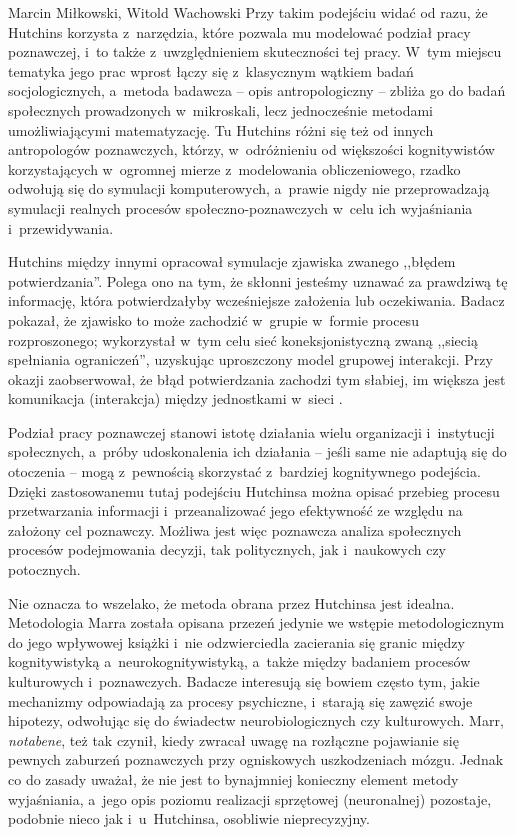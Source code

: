 \begin{artplenv2auth}{Marcin Miłkowski, Witold Wachowski}
Przy takim podejściu widać od razu, że Hutchins korzysta z~narzędzia, które pozwala mu modelować podział pracy poznawczej, i~to także z~uwzględnieniem skuteczności tej pracy. W~tym miejscu tematyka jego prac wprost łączy się z~klasycznym wątkiem badań socjologicznych, a~metoda badawcza -- opis antropologiczny -- zbliża go do badań społecznych prowadzonych w~mikroskali, lecz jednocześnie metodami umożliwiającymi matematyzację. Tu Hutchins różni się też od innych antropologów poznawczych, którzy, w~odróżnieniu od większości kognitywistów korzystających w~ogromnej mierze z~modelowania obliczeniowego, rzadko odwołują się do symulacji komputerowych, a~prawie nigdy nie przeprowadzają symulacji realnych procesów społeczno-poznawczych w~celu ich wyjaśniania i~przewidywania.

Hutchins między innymi opracował symulacje zjawiska zwanego ,,błędem potwierdzania''. Polega ono na tym, że skłonni jesteśmy uznawać za prawdziwą tę informację, która potwierdzałyby wcześniejsze założenia lub oczekiwania. Badacz pokazał, że zjawisko to może zachodzić w~grupie w~formie procesu rozproszonego; wykorzystał w~tym celu sieć koneksjonistyczną zwaną ,,siecią spełniania ograniczeń'', uzyskując uproszczony model grupowej interakcji. Przy okazji zaobserwował, że błąd potwierdzania zachodzi tym słabiej, im większa jest komunikacja (interakcja) między jednostkami w~sieci
\parencite[][s.~239–255]{hutchins_cognition_1995}.%


Podział pracy poznawczej stanowi istotę działania wielu organizacji i~instytucji społecznych, a~próby udoskonalenia ich działania -- jeśli same nie adaptują się do otoczenia -- mogą z~pewnością skorzystać z~bardziej kognitywnego podejścia. Dzięki zastosowanemu tutaj podejściu Hutchinsa można opisać przebieg procesu przetwarzania informacji i~przeanalizować jego efektywność ze względu na założony cel poznawczy. Możliwa jest więc poznawcza analiza społecznych procesów podejmowania decyzji, tak politycznych, jak i~naukowych czy potocznych.

Nie oznacza to wszelako, że metoda obrana przez Hutchinsa jest idealna. Metodologia Marra została opisana przezeń jedynie we wstępie metodologicznym do jego wpływowej książki i~nie odzwierciedla zacierania się granic między kognitywistyką a~neurokognitywistyką, a~także między badaniem procesów kulturowych i~poznawczych. Badacze interesują się bowiem często tym, jakie mechanizmy odpowiadają za procesy psychiczne, i~starają się zawęzić swoje hipotezy, odwołując się do świadectw neurobiologicznych czy kulturowych. Marr, \textit{notabene}, też tak czynił, kiedy zwracał uwagę na rozłączne pojawianie się pewnych zaburzeń poznawczych przy ogniskowych uszkodzeniach mózgu. Jednak co do zasady uważał, że nie jest to bynajmniej konieczny element metody wyjaśniania, a~jego opis poziomu realizacji sprzętowej (neuronalnej) pozostaje, podobnie nieco jak i~u~Hutchinsa, osobliwie nieprecyzyjny.


\end{artplenv2auth}
